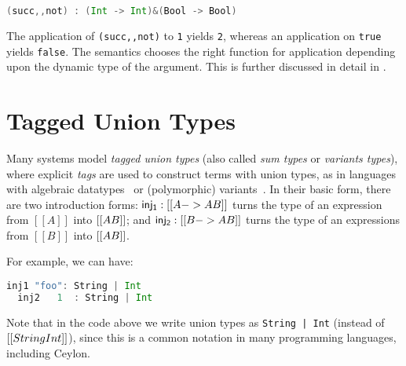 \begin{lstlisting}[language=Scala]
  (succ,,not) : (Int -> Int)&(Bool -> Bool)
\end{lstlisting}

\noindent The application of \lstinline{(succ,,not)} to 
\lstinline{1} yields \lstinline{2}, whereas an
application on \lstinline{true}
yields \lstinline{false}. The semantics chooses the right function
for application
depending upon the dynamic type of the argument.
This is further discussed in detail in .







\section{Tagged Union Types}


Many systems model \textit{tagged union types} (also called
\textit{sum types} or \textit{variants types}), where explicit \textit{tags}
are used to construct terms with union types, 
as in languages with algebraic datatypes~\citep{hope}
or (polymorphic) variants~\citep{garrigue98}.
In their basic form, there are two introduction forms:
$\mathsf{inj_1} : [[A -> A \/ B]]$ turns the type of an expression from
$[[A]]$ into $[[A \/ B]]$; and $\mathsf{inj_2} : [[B -> A \/ B]]$
turns the type of an expressions from $[[B]]$ into $[[A \/ B]]$.

For example, we can have:

\begin{lstlisting}[language=Scala]
  inj1 "foo": String | Int
  inj2   1  : String | Int
\end{lstlisting}

\noindent Note that in the code above we write union types as
\lstinline{String | Int} (instead of $[[String \/ Int]]$),
since this is a common notation in many programming languages,
including Ceylon.

